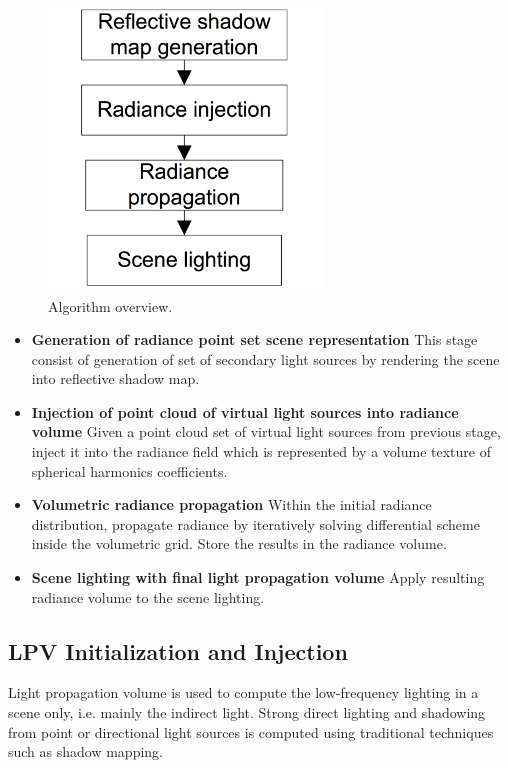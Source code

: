 \begin{figure}
\sidecaption
	\includegraphics[width=0.65\textwidth]{graphics/lpv/lpv-1}
	\caption{Algorithm overview.}
	\label{f:lpv-process}
\end{figure}

\begin{itemize}
	\item \textbf{Generation of radiance point set scene representation} This stage consist of generation of set of secondary light sources by rendering the scene into reflective shadow map.
	\item \textbf{Injection of point cloud of virtual light sources into radiance volume} Given a point cloud set of virtual light sources from previous stage, inject it into the radiance field which is represented by a volume texture of spherical harmonics coefficients.
	\item \textbf{Volumetric radiance propagation} Within the initial radiance distribution, propagate radiance by iteratively solving differential scheme inside the volumetric grid. Store the results in the radiance volume.
	\item \textbf{Scene lighting with final light propagation volume} Apply resulting radiance volume to the scene lighting. 
\end{itemize}




\subsection{LPV Initialization and Injection}
Light propagation volume is used to compute the low-frequency lighting in a scene only, i.e. mainly the indirect light. Strong direct lighting and shadowing from point or directional light sources is computed using traditional techniques such as shadow mapping.

